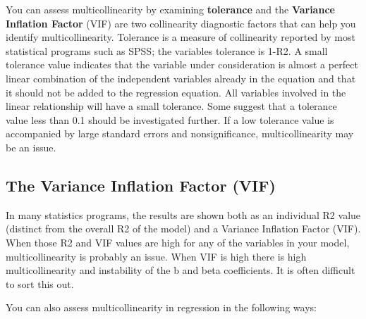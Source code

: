 \documentclass[a4paper,12pt]{article}
\begin{document}
     You can assess multicollinearity by examining \textbf{tolerance} and the \textbf{Variance Inflation Factor} (VIF) are two collinearity diagnostic factors that can help you identify multicollinearity. Tolerance is a measure of collinearity reported by most statistical programs such as SPSS; the variables tolerance is 1-R2. A small tolerance value indicates that the variable under consideration is almost a perfect linear combination of the independent variables already in the equation and that it should not be added to the regression equation. All variables involved in the linear relationship will have a small tolerance. Some suggest that a tolerance value less than 0.1 should be investigated further. If a low tolerance value is accompanied by large standard errors and nonsignificance, multicollinearity may be an issue.


\subsection{The Variance Inflation Factor (VIF)}



   In many statistics programs, the results are shown both as an individual R2 value (distinct from the overall R2 of the model) and a Variance Inflation Factor (VIF). When those R2 and VIF values are high for any of the variables in your model, multicollinearity is probably an issue. When VIF is high there is high multicollinearity and instability of the b and beta coefficients. It is often difficult to sort this out. \\

\bigskip

You can also assess multicollinearity in regression in the following ways:
\end{document}

